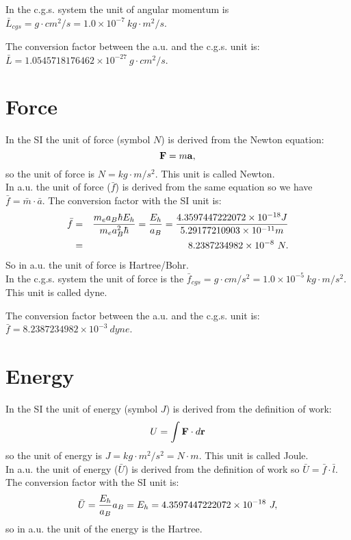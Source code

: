 \documentclass[12pt,a4paper]{article}
\def\barl{5.29177210903\times 10^{-11}}
\def\barf{8.2387234982\times 10^{-8}}
\def\baru{4.3597447222072\times 10^{-18}}
\def\ltol{1.0\times 10^{-7}}
\def\ftof{1.0\times 10^{-5}}
\def\baramcgs{1.0545718176462\times 10^{-27}}
\def\barfcgs{8.2387234982\times 10^{-3}}
\begin{document}
{\color{orange} In the c.g.s. system the unit of angular momentum is 
$\bar L_{cgs}=g\cdot cm^2/s = \ltol\ kg\cdot m^2/s$.
\\
}

{\color{green} The conversion factor between the a.u. and the c.g.s. unit is:
$\bar L=\baramcgs\ g\cdot cm^2/s$.
\\
}

\newpage
\section{\color{coral}Force}
In the SI the unit of force (symbol $N$) is derived from  
the Newton equation:
\begin{equation}
{\bf F}= m {\bf a},
\end{equation} 
so the unit of force is $N=kg\cdot m/s^2$. This unit is called Newton.
\\

{\color{web-blue} In a.u. the unit of force ($\bar f$) is derived 
from the same equation so we have $\bar f =\bar m \cdot \bar a$. The
conversion factor with the SI unit is: 
\begin{eqnarray}
\bar f &=& {m_e a_B \hbar E_h \over m_e a_B^2 \hbar }= 
{E_h\over a_B}\nonumber={\baru J \over \barl m}\nonumber \\
&=&\barf\ N. 
\end{eqnarray}
So in a.u. the unit of force is Hartree/Bohr.
}
\\

{\color{orange} In the c.g.s. system the unit of force is the 
$\bar f_{cgs}=g\cdot cm/s^2 = \ftof\ kg\cdot m/s^2$. This unit is 
called dyne.
\\
}

{\color{green} The conversion factor between the a.u. and the c.g.s. unit is:
$\bar f=\barfcgs\ dyne$.
\\
}
\newpage

\section{\color{coral}Energy}
In the SI the unit of energy (symbol $J$) is derived from the 
definition of work: 
\begin{equation}
U= \int {\bf F} \cdot d{\bf r}
\end{equation} 
so the unit of energy is $J=kg\cdot m^2/s^2=N\cdot m$. This unit is 
called Joule.
\\

{\color{web-blue} In a.u. the unit of energy ($\bar U$) is derived 
from the definition of work so $\bar U =\bar f \cdot \bar l$. The 
conversion factor with the SI unit is: 
\begin{equation}
\bar U = {E_h\over a_B} a_B=E_h=\baru\ J, 
\end{equation}
so in a.u. the unit of the energy is the Hartree.
}
\\
\end{document}
